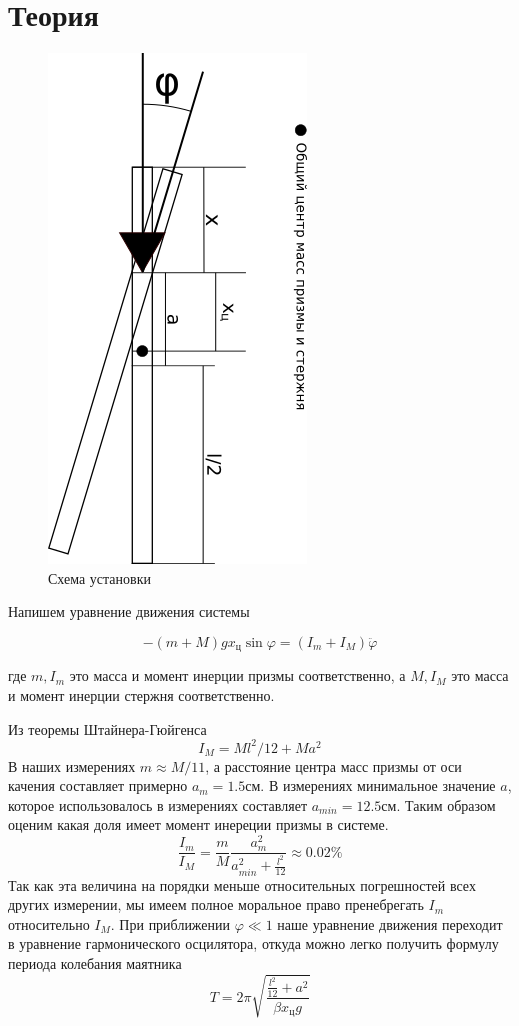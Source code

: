 \documentclass[a4paper, 12pt]{article}
\begin{document}
    \section{Теория}
    \begin{figure}
        \begin{center}
            \includegraphics[scale=0.8]{gr.png}
            \caption{Схема установки}
        \end{center}
    \end{figure}

    Напишем уравнение движения системы

    \[-(m+M)gx_ц \sin{\varphi} = (I_m+I_M)\ddot{\varphi}\]

    где $m, I_m$ это масса и момент инерции призмы соответственно, а $M, I_M$ это масса и момент инерции стержня соответственно.

    Из теоремы Штайнера-Гюйгенса \[I_M=Ml^{2}/12+Ma^2\]
    В наших измерениях $m\approx M/11$, а расстояние центра масс призмы от оси качения составляет примерно $a_m=1.5см$. В измерениях минимальное значение $a$, которое использовалось в измерениях составляет $a_{min}=12.5см$. Таким образом оценим какая доля имеет момент инереции призмы в системе.
    \[\frac{I_m}{I_M}=\frac{m}{M}\frac{a_m^{2}}{a_{min}^{2}+\frac{l^{2}}{12}}\approx 0.02\%\]
    Так как эта величина на порядки меньше относительных погрешностей всех других измерении, мы имеем полное моральное право пренебрегать $I_m$ относительно $I_M$.
    \newline
    При приближении $\varphi\ll 1$ наше уравнение движения переходит в уравнение гармонического осцилятора, откуда можно легко получить формулу периода колебания маятника
    \begin{equation}
        T=2\pi \sqrt{\frac{\frac{l^{2}}{12}+a^{2}}{\beta x_ц g}}
    \end{equation}
\end{document}
